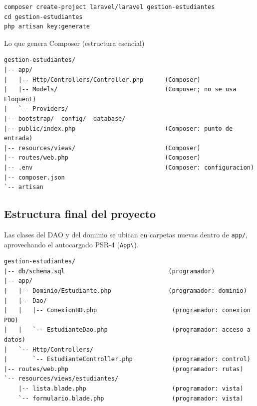 \begin{lstlisting}[style=shell,caption={Creacion del proyecto Laravel},label={lst:lv-create}]
composer create-project laravel/laravel gestion-estudiantes
cd gestion-estudiantes
php artisan key:generate
\end{lstlisting}

\begin{cajaejemplo}{Lo que genera Composer (estructura esencial)}
\begin{lstlisting}[style=shell,caption={Esqueleto creado por laravel/laravel},label={lst:lv-skel}]
gestion-estudiantes/
|-- app/
|   |-- Http/Controllers/Controller.php      (Composer)
|   |-- Models/                              (Composer; no se usa Eloquent)
|   `-- Providers/
|-- bootstrap/  config/  database/
|-- public/index.php                         (Composer: punto de entrada)
|-- resources/views/                         (Composer)
|-- routes/web.php                           (Composer)
|-- .env                                     (Composer: configuracion)
|-- composer.json
`-- artisan
\end{lstlisting}
\end{cajaejemplo}

\subsection{Estructura final del proyecto}
\label{ap:crud:laravel:estructura}

Las clases del DAO y del dominio se ubican en carpetas nuevas dentro de
\texttt{app/}, aprovechando el autocargado PSR-4 (\texttt{App\textbackslash}).

\begin{lstlisting}[style=shell,caption={Estructura completa de la pista Laravel},label={lst:lv-tree}]
gestion-estudiantes/
|-- db/schema.sql                             (programador)
|-- app/
|   |-- Dominio/Estudiante.php                (programador: dominio)
|   |-- Dao/
|   |   |-- ConexionBD.php                     (programador: conexion PDO)
|   |   `-- EstudianteDao.php                  (programador: acceso a datos)
|   `-- Http/Controllers/
|       `-- EstudianteController.php           (programador: control)
|-- routes/web.php                             (programador: rutas)
`-- resources/views/estudiantes/
    |-- lista.blade.php                        (programador: vista)
    `-- formulario.blade.php                   (programador: vista)
\end{lstlisting}

